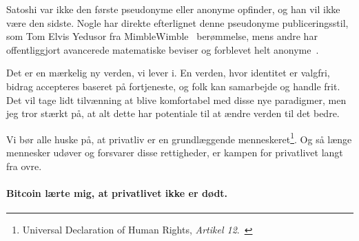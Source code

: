 Satoshi var ikke den første pseudonyme eller anonyme opfinder, og han vil ikke være den
sidste. Nogle har direkte efterlignet denne pseudonyme publiceringsstil, som Tom
Elvis Yedusor fra MimbleWimble~\cite{mimblewimble-origin} berømmelse, mens andre har
offentliggjort avancerede matematiske beviser og forblevet helt
anonyme~\cite{4chan-math}.

Det er en mærkelig ny verden, vi lever i. En verden, hvor identitet er
valgfri, bidrag accepteres baseret på fortjeneste, og folk kan
samarbejde og handle frit. Det vil tage lidt tilvænning at blive
komfortabel med disse nye paradigmer, men jeg tror stærkt på, at alt dette har potentiale
til at ændre verden til det bedre.

Vi bør alle huske på, at privatliv er en grundlæggende menneskeret\footnote{Universal Declaration of Human Rights, \textit{Artikel 12}.~\cite{article12}}. Og så længe
mennesker udøver og forsvarer disse rettigheder, er kampen for privatlivet langt fra
ovre.

\paragraph{Bitcoin lærte mig, at privatlivet ikke er dødt.}

%
%
%
%

